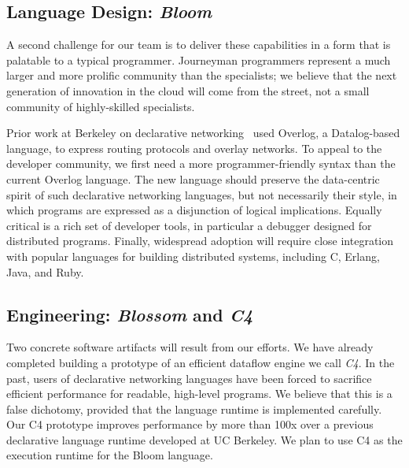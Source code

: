 \subsection{Language Design: \emph{Bloom}}
A second challenge for our team is to deliver these capabilities in a form that
is palatable to a typical programmer.  Journeyman programmers represent a much
larger and more prolific community than the specialists; we believe that the
next generation of innovation in the cloud will come from the street, not a
small community of highly-skilled specialists.

Prior work at Berkeley on declarative networking~\cite{loo-sigcomm05, loo-sosp05, loo-sigmod06} 
used Overlog, a Datalog-based language, to express routing protocols and overlay networks.
To appeal to the developer community, we first need a more
programmer-friendly syntax than the current Overlog language. 
The new language should preserve the data-centric spirit of such
declarative networking languages, but not necessarily their style,
in which programs are expressed as a disjunction of logical implications.
Equally
critical is a rich set of developer tools, in particular a debugger
designed for distributed programs.  Finally, widespread adoption will
require close integration with popular languages for building distributed
systems, including C, Erlang, Java, and Ruby.

\subsection{Engineering: \emph{Blossom} and \emph{C4}}
Two concrete software artifacts will result from our efforts. 
We have already completed building a prototype of an efficient dataflow
engine we call \emph{C4}. In the past, users of declarative networking
languages have been forced to sacrifice efficient performance for
readable, high-level programs. We believe that this is a false
dichotomy, provided that the language runtime is implemented
carefully. Our C4 prototype improves performance by more than
100x over a previous declarative language runtime developed at UC
Berkeley. We plan to use C4 as the execution runtime for the Bloom
language. 

